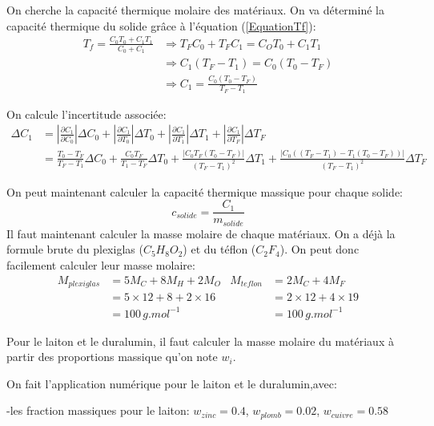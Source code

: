 \documentclass[12pt]{article}
\begin{document}
On cherche la capacité thermique molaire des matériaux. On va déterminé la capacité thermique du solide grâce à l'équation (\ref{EquationTf}):
\begin{align*}
T_f=\frac{C_0T_0+C_1T_1}{C_0+C_1} &\Rightarrow T_FC_0+T_FC_1=C_OT_0+C_1T_1 \\
&\Rightarrow C_1(T_F-T_1)=C_0(T_0-T_F) \\
&\Rightarrow C_1=\frac{C_0(T_0-T_F)}{T_F-T_1}
\end{align*}

On calcule l'incertitude associée:
\begin{align*}
\Delta C_1 &= \displaystyle\left\lvert \frac{\partial C_1}{\partial C_0}\right\rvert \Delta C_0 + \displaystyle\left\lvert \frac{\partial C_1}{\partial T_0}\right\rvert \Delta T_0 + \displaystyle\left\lvert \frac{\partial C_1}{\partial T_1}\right\rvert \Delta T_1 + \displaystyle\left\lvert \frac{\partial C_1}{\partial T_F}\right\rvert \Delta T_F \\
&= \frac{T_0-T_F}{T_F-T_1}\Delta C_0 + \frac{C_0T_F}{T_1-T_F}\Delta T_0 + \frac{\displaystyle\left\lvert C_0T_F(T_0-T_F)  \right\rvert}{(T_F-T_1)^2}\Delta T_1 + \frac{\displaystyle\left\lvert C_0((T_F-T_1)-T_1(T_0-T_F))   \right\rvert}{(T_F-T_1)^2}\Delta T_F
\end{align*}




On peut maintenant calculer la capacité thermique massique pour chaque solide:
\begin{equation}
c_{solide}=\frac{C_1}{m_{solide}}
\end{equation}
Il faut maintenant calculer la masse molaire de chaque matériaux. On a déjà la formule brute du plexiglas ($C_5H_8O_2$) et du téflon ($C_2F_4$). On peut donc facilement calculer leur masse molaire:
\begin{align*}
M_{plexiglas}&=5M_C+8M_H+2M_O & M_{teflon}&=2M_C+4M_F  \\
&=5\times 12+8+2\times 16 & &=2\times 12+4\times 19 \\
&=100\, g.mol^{-1} & &=100\, g.mol^{-1}
\end{align*}

Pour le laiton et le duralumin, il faut calculer la masse molaire du matériaux à partir des proportions massique qu'on note $w_{i}$. 

On fait l'application numérique pour le laiton et le duralumin,avec:

	-les fraction massiques pour le laiton: $w_{zinc}=0.4$, $w_{plomb}=0.02$, $w_{cuivre}=0.58$
	
\end{document}
